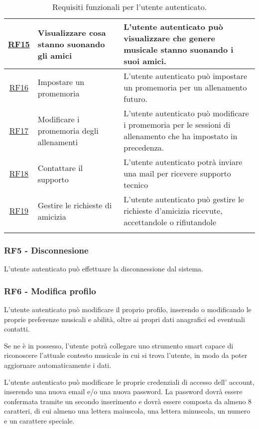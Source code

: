 \documentclass[12pt, a4paper]{article}
\begin{document}
\begin{longtable}{|c|p{5cm}|p{7cm}|}
    \hline \hyperlink{RF15}{RF15} & Visualizzare cosa stanno suonando gli amici & L'utente autenticato può visualizzare che genere musicale stanno suonando i suoi amici.                             \\ \hline
    \hline \hyperlink{RF16}{RF16} & Impostare un promemoria                     & L'utente autenticato può impostare un promemoria per un allenamento futuro.                                         \\ \hline
    \hline \hyperlink{RF17}{RF17} & Modificare i promemoria degli allenamenti   & L'utente autenticato può modificare i promemoria per le sessioni di allenamento che ha impostato in precedenza.     \\ \hline
    \hline \hyperlink{RF18}{RF18} & Contattare il supporto                      & L'utente autenticato potrà inviare una mail per ricevere supporto tecnico                                           \\ \hline
    \hline \hyperlink{RF19}{RF19} & Gestire le richieste di amicizia            & L'utente autenticato può gestire le richieste d'amicizia ricevute, accettandole o rifiutandole
    \\ \hline
    \caption{Requisiti funzionali per l'utente autenticato.}
\end{longtable}

\subsubsection*{\hypertarget{RF5}{RF5 - Disconnesione}}

L'utente autenticato può effettuare la disconnessione dal sistema.

\subsubsection*{\hypertarget{RF6}{RF6 - Modifica profilo}}
L'utente autenticato può modificare il proprio profilo, inserendo o modificando le proprie preferenze musicali e abilità, oltre ai propri dati anagrafici ed eventuali contatti.


Se ne è in possesso, l'utente potrà collegare uno strumento smart capace di riconoscere l'attuale contesto musicale in cui si trova l'utente, in modo da poter aggiornare automaticamente i dati.


L'utente autenticato può modificare le proprie credenziali di accesso dell' account, inserendo una nuova email e/o una nuova password. La password dovrà essere confermata tramite un secondo inserimento e dovrà essere composta da almeno 8 caratteri, di cui almeno una lettera maiuscola, una lettera minuscola, un numero e un carattere speciale.
\end{document}
